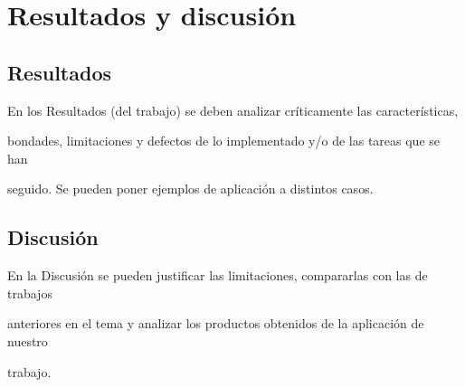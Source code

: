 \newpage\mbox{}\thispagestyle{empty}

\chapter{Resultados y discusión}

\section{Resultados}
En los Resultados (del trabajo) se deben analizar críticamente las características, 

bondades, limitaciones y defectos de lo implementado y/o de las tareas que se han 

seguido. Se pueden poner ejemplos de aplicación a distintos casos.

\section{Discusión}

En la Discusión se pueden justificar las limitaciones, compararlas con las de trabajos 

anteriores en el tema y analizar los productos obtenidos de la aplicación de nuestro 

trabajo.



